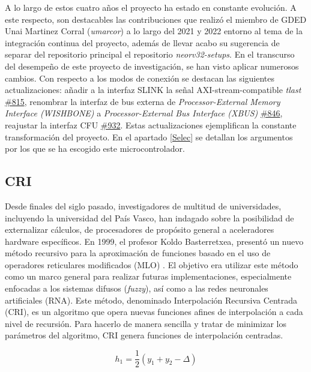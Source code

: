 A lo largo de estos cuatro años el proyecto ha estado en constante evolución.
A este respecto, son destacables las contribuciones que realizó el miembro de GDED Unai Martinez Corral (\textit{umarcor}) a lo largo del 2021 y 2022 entorno al tema de la integración continua del proyecto, además de llevar acabo su sugerencia de separar del repositorio principal el repositorio \textit{neorv32-setups}.
En el transcurso del desempeño de este proyecto de investigación, se han visto aplicar numerosos cambios.
Con respecto a los modos de conexión se destacan las siguientes actualizaciones:
añadir a la interfaz SLINK la señal AXI-stream-compatible \textit{tlast} \href{https://github.com/stnolting/neorv32/pull/815}{\#815}, renombrar la interfaz de bus externa de \textit{Processor-External Memory Interface (WISHBONE)} a \textit{Processor-External Bus Interface (XBUS)} \href{https://github.com/stnolting/neorv32/pull/846}{\#846}, reajustar la interfaz CFU \href{https://github.com/stnolting/neorv32/pull/932}{\#932}.
Estas actualizaciones ejemplifican la constante transformación del proyecto. 
En el apartado \ref{Selec} se detallan los argumentos por los que se ha escogido este microcontrolador.

\subsection{CRI}

\label{cri}

Desde finales del siglo pasado, investigadores de multitud de universidades, incluyendo la universidad del País Vasco, han indagado sobre la posibilidad de externalizar cálculos, de procesadores de propósito general a aceleradores hardware específicos.
En 1999, el profesor Koldo Basterretxea, presentó un nuevo método recursivo para la aproximación de funciones basado en el uso de operadores reticulares modificados (MLO) \cite{basterretxea1999pwl} \cite{tarela2002optimised}.
El objetivo era utilizar este método como un marco general para realizar futuras implementaciones, especialmente enfocadas a los sistemas difusos (\textit{fuzzy}), así como a las redes neuronales artificiales (RNA).
Este método, denominado Interpolación Recursiva Centrada (CRI), es un algoritmo que opera nuevas funciones afines de interpolación a cada nivel de recursión.
Para hacerlo de manera sencilla y tratar de minimizar los parámetros del algoritmo, CRI genera funciones de interpolación centradas.

\begin{equation}\label{ec:1}
h_{1} = \frac{1}{2} (y_{1} + y_{2} - \Delta)\tag{*}
\end{equation}

